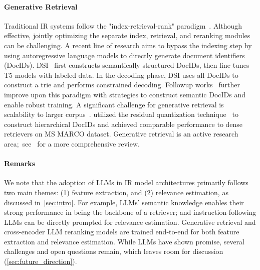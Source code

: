 \paragraph{Generative Retrieval}
Traditional IR systems follow the "index-retrieval-rank" paradigm~\cite{schutze2008introduction}. Although effective, jointly optimizing the separate index, retrieval, and reranking modules can be challenging. 
A recent line of research aims to bypass the indexing step by using autoregressive language models to directly generate document identifiers (DocIDs). 
\textsc{DSI}~\cite{tay2022transformer} first constructs semantically structured DocIDs, then fine-tunes \textsc{T5} models with labeled data. In the decoding phase, \textsc{DSI} uses all DocIDs to construct a trie and performs constrained decoding. 
Followup works~\cite{wang2022neuralcorpus,bevilacqua2022autoregressive} further improve upon this paradigm with strategies to construct semantic DocIDs and enable robust training. 
A significant challenge for generative retrieval is scalability to larger corpus~\cite{pradeep-etal-2023-generative}. 
\citet{zeng2024scalable} utilized the residual quantization technique~\cite{chen2010approximate} to construct hierarchical DocIDs and achieved comparable performance to dense retrievers on MS MARCO dataset. 
Generative retrieval is an active research area;~see~\cite{li2024matching} for a more comprehensive review.

\paragraph{Remarks}
We note that the adoption of LLMs in IR model architectures primarily follows two main themes: (1) feature extraction, and (2) relevance estimation, as discussed in~\cref{sec:intro}. For example, LLMs' semantic knowledge enables their strong performance in being the backbone of a retriever; and instruction-following LLMs can be directly prompted for relevance estimation. Generative retrieval and cross-encoder LLM reranking models are trained end-to-end for both feature extraction and relevance estimation. 
While LLMs have shown promise, several challenges and open questions remain, which leaves room for discussion (\cref{sec:future_direction}).